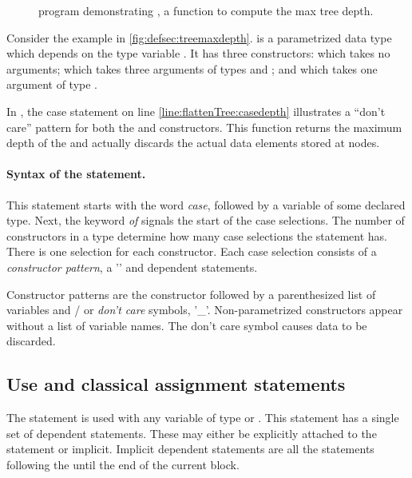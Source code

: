 \begin{figure}[htbp]
\begin{singlespace}

\end{singlespace}
\caption[Tree depth program to demonstrate ]{\lqpl{} program demonstrating , a function to compute the max tree depth.}
\label{fig:defsec:treemaxdepth}
\end{figure}

Consider the example in \vref{fig:defsec:treemaxdepth}. 
is a parametrized data type which depends on 
the type variable . It
 has three constructors:  which takes no arguments;
 which takes three arguments of types  and
; and  which takes one argument of type
.

In , the case statement on line
\ref{line:flattenTree:casedepth} illustrates a ``don't care'' pattern for
both the  and  constructors. This function
 returns the maximum depth of the  and actually
discards  the actual data elements stored at nodes.



\paragraph{Syntax of the  statement.} This statement
starts with the word \emph{case}, 
followed by a variable   of some declared type.
Next, the keyword \emph{of} signals the start of the case selections.
The number of constructors in a type determine how many 
case selections the statement has. There is one selection 
for each constructor.
Each case selection consists of  a \emph{constructor pattern}, a
'\inlqpl{=>}' and dependent statements. 

Constructor patterns 
are the constructor followed by a parenthesized list of 
variables and / or \emph{don't care} symbols, '\_'.  Non-parametrized 
constructors appear without a list of variable names. The 
don't care symbol causes data to be discarded.

\subsection{Use and classical assignment statements}\label{subsec:usestatements}

The  statement is used with any variable of type 
or . 
This statement  has a single 
set of dependent statements. These may 
either be explicitly attached to the  statement or implicit.
Implicit dependent statements are all the statements following
the  until the end of the current block. 

